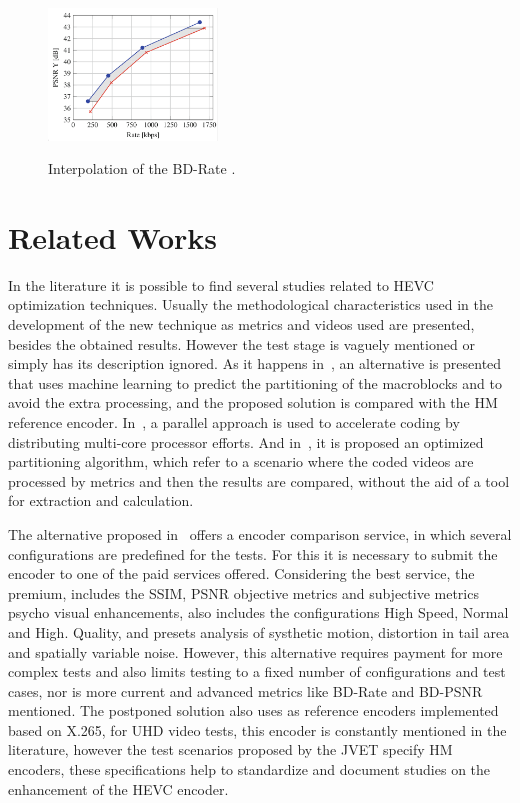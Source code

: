 \documentclass[journal]{IEEEtran}
\begin{document}
\FloatBarrier
\begin{figure}[!ht]
	\centering
	\caption{Interpolation of the BD-Rate \cite{Mathias}.}
	\includegraphics[width=0.4\textwidth]{figures/chartbdrate.png}
	\label{fig:chart_barate}
\end{figure}
\FloatBarrier
	

\section{Related Works}


In the literature it is possible to find several studies related to HEVC optimization techniques. Usually the methodological characteristics used in the development of the new technique as metrics and videos used are presented, besides the obtained results. However the test stage is vaguely mentioned or simply has its description ignored. As it happens in~\cite{oliveira:16}, an alternative is presented that uses machine learning to predict the partitioning of the macroblocks and to avoid the extra processing, and the proposed solution is compared with the HM reference encoder. In~\cite{Wang:16}, a parallel approach is used to accelerate coding by distributing multi-core processor efforts. And in~\cite{wang:13}, it is proposed an optimized partitioning algorithm, which refer to a scenario where the coded videos are processed by metrics and then the results are compared, without the aid of a tool for extraction and calculation.


The alternative proposed in~\cite{msu:16} offers a encoder comparison service, in which several configurations are predefined for the tests. For this it is necessary to submit the encoder to one of the paid services offered. Considering the best service, the premium, includes the SSIM, PSNR objective metrics and subjective metrics psycho visual enhancements, also includes the configurations High Speed, Normal and High. Quality, and presets analysis of systhetic motion, distortion in tail area and spatially variable noise. However, this alternative requires payment for more complex tests and also limits testing to a fixed number of configurations and test cases, nor is more current and advanced metrics like BD-Rate and BD-PSNR mentioned. The postponed solution also uses as reference encoders implemented based on X.265, for UHD video tests, this encoder is constantly mentioned in the literature, however the test scenarios proposed by the JVET specify HM encoders, these specifications help to standardize and document studies on the enhancement of the HEVC encoder.
\end{document}
